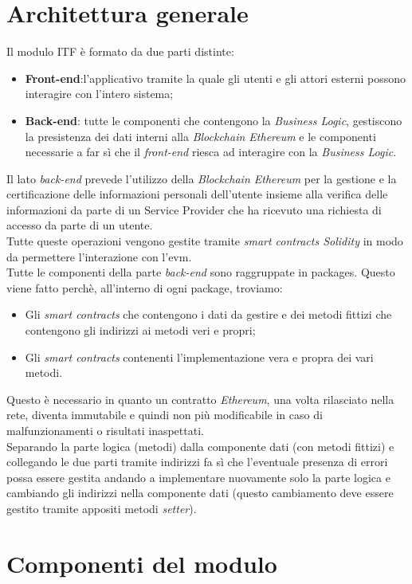 \section{Architettura generale}
Il modulo \gls{ITF} è formato da due parti distinte:
\begin{itemize}
	\item \textbf{Front-end}:l'applicativo tramite la quale gli utenti e gli attori esterni possono interagire con l'intero sistema;
	\item \textbf{Back-end}: tutte le componenti che contengono la \textit{Business Logic}, gestiscono la presistenza dei dati interni alla \textit{Blockchain Ethereum} e le componenti necessarie a far sì che il \textit{front-end} riesca ad interagire con la \textit{Business Logic}.
\end{itemize}
Il lato \textit{back-end} prevede l'utilizzo della \textit{Blockchain Ethereum} per la gestione e la certificazione delle informazioni personali dell'utente insieme alla verifica delle informazioni da parte di un Service Provider che ha ricevuto una richiesta di accesso da parte di un utente.\\
Tutte queste operazioni vengono gestite tramite \textit{smart contracts Solidity} in modo da permettere l'interazione con l'\gls{evm}.\\
Tutte le componenti della parte \textit{back-end} sono raggruppate in packages. Questo viene fatto perchè, all'interno di ogni package, troviamo:
\begin{itemize}
	\item Gli \textit{smart contracts} che contengono i dati da gestire e dei metodi fittizi che contengono gli indirizzi ai metodi veri e propri;
	\item Gli \textit{smart contracts} contenenti l'implementazione vera e propra dei vari metodi.
\end{itemize}
Questo è necessario in quanto un contratto \textit{Ethereum}, una volta rilasciato nella rete, diventa immutabile e quindi non più modificabile in caso di malfunzionamenti o risultati inaspettati.\\
Separando la parte logica (metodi) dalla componente dati (con metodi fittizi) e collegando le due parti tramite indirizzi fa sì che l'eventuale presenza di errori possa essere gestita andando a implementare nuovamente solo la parte logica e cambiando gli indirizzi nella componente dati (questo cambiamento deve essere gestito tramite appositi metodi \textit{setter}).
\section{Componenti del modulo}
